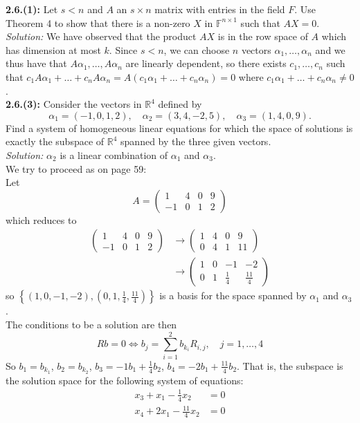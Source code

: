 \documentclass[a4paper]{article}
\theoremstyle{plain}%
\theoremstyle{definition}
\theoremstyle{remark}
\begin{document}
\textbf{2.6.(1):} Let $s < n$ and $A$ an $s \times n$ matrix
with entries in the field $F$. Use Theorem 4 to show that there is a non-zero
$X$ in $\mathbb{F}^{n \times 1}$ such that $AX = 0$.\\
\textit{Solution:} We have observed that
the product $AX$ is in the row space of $A$ which has dimension at most
$k$. Since $s < n$, we can choose $n$ vectors
$\alpha_1, \ldots, \alpha_n$ and we thus have that
$A \alpha_1, \ldots, A \alpha_n$ are linearly dependent, so there exists
$c_1, \ldots, c_n$ such that
$c_1 A \alpha_1 + \ldots + c_n A \alpha_n
= A \left( c_1 \alpha_1 + \ldots + c_n \alpha_n \right) =0$ where
$c_1 \alpha_1 + \ldots + c_n \alpha_n \neq 0$.\\
\linebreak
\textbf{2.6.(3):} Consider the vectors in $\mathbb{R}^{4}$ defined by
\[
\alpha_1 = \left( -1, 0, 1, 2 \right) , \quad
\alpha_2 = \left( 3,4,-2,5 \right) ,
\quad \alpha_3 = \left( 1,4,0,9 \right) . 
\] 
Find a system of homogeneous linear equations for which the space of solutions
is exactly the subspace of $\mathbb{R}^{4}$ spanned by the three given
vectors.\\
\linebreak
\textit{Solution:} 
$\alpha_2$ is a linear combination of $\alpha_1$ and $\alpha_3$.\\
We try to proceed as on page 59:\\
Let
\[
    A = \begin{pmatrix} 
        1 & 4 & 0 & 9\\
        -1 & 0 & 1 & 2
     \end{pmatrix} 
\] 
which reduces to
\begin{align*}
    \begin{pmatrix} 
        1 & 4 & 0 & 9\\
        -1 & 0 & 1 & 2
     \end{pmatrix} 
     &\to 
     \begin{pmatrix} 1 & 4 & 0 & 9\\
     0 & 4 & 1 & 11 \end{pmatrix} \\
        &\to \begin{pmatrix} 1 & 0 & -1 & -2\\
         0 & 1 & \frac{1}{4} & \frac{11}{4} \end{pmatrix} 
\end{align*}
so
$\left\{ \left( 1,0,-1,-2 \right) ,
\left( 0, 1, \frac{1}{4}, \frac{11}{4} \right) \right\} $
is a basis for the space spanned by $\alpha_1$ and $\alpha_3$.\\
The conditions to be a solution are then
\[
Rb = 0 \iff b_j = \sum_{i=1}^{2} b_{k_i}R_{i,j}, \quad j = 1,\ldots, 4
\] 
So 
$b_1 = b_{k_1} $,
$b_2 = b_{k_2}$,
$b_3 = -1 b_1 + \frac{1}{4} b_2$,
$b_4 = -2 b_1 + \frac{11}{4}b_2$. That is, the subspace is the solution space
for the following system of equations:
\begin{align*}
    x_3 + x_1 - \frac{1}{4} x_2 &= 0\\
    x_4 + 2x_1 - \frac{11}{4}x_2 &= 0
\end{align*}
\end{document}
